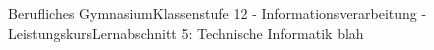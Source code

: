 \documentclass[11pt,oneside,openany,headings=optiontotoc,11pt,numbers=noenddot]{article}
\begin{document}
	\begin{worksheet}{Berufliches Gymnasium}{Klassenstufe 12 - Informationsverarbeitung - Leistungskurs}{Lernabschnitt 5: Technische Informatik}
		\setlength{\columnseprule}{0pt}
		blah
	\end{worksheet}
\end{document}
